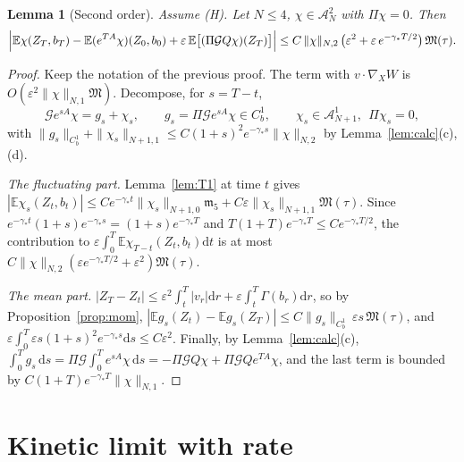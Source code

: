 \documentclass[11pt]{article}
\newcommand{\dd}{\mathrm{d}}
\newcommand{\E}{\mathbb{E}}
\newcommand{\eps}{\varepsilon}
\newcommand{\cG}{\mathcal{G}}
\newcommand{\cA}{\mathcal{A}}
\newcommand{\fm}{\mathfrak{m}}
\newcommand{\fM}{\mathfrak{M}}
\newcommand{\nrm}[2]{\|#1\|_{#2}}
\newtheorem{lemma}[theorem]{Lemma}
\theoremstyle{remark}
\begin{document}
\begin{lemma}[Second order]\label{lem:T2}
Assume (H). Let $N\le4$, $\chi\in\cA_N^2$ with $\Pi\chi=0$. Then
\[
  \Bigl|\E\chi(Z_T,b_T)-\E(e^{TA}\chi)(Z_0,b_0)
     +\eps\,\E\bigl[(\Pi\cG Q\chi)(Z_T)\bigr]\Bigr|
  \le C\,\nrm{\chi}{N,2}\,\bigl(\eps^2+\eps\,e^{-\gamma_*T/2}\bigr)\,\fM(\tau).
\]
\end{lemma}

\begin{proof}
Keep the notation of the previous proof. The term with $v\cdot\nabla_XW$
is $O(\eps^2\nrm{\chi}{N,1}\fM)$. Decompose, for $s=T-t$,
\[
  \cG e^{sA}\chi=g_s+\chi_s,\qquad g_s=\Pi\cG e^{sA}\chi\in C_b^1,\qquad
  \chi_s\in\cA_{N+1}^1,\ \ \Pi\chi_s=0,
\]
with $\nrm{g_s}{C_b^1}+\nrm{\chi_s}{N+1,1}\le
C(1+s)^2e^{-\gamma_*s}\nrm{\chi}{N,2}$ by Lemma~\ref{lem:calc}(c),(d).

\emph{The fluctuating part.} Lemma~\ref{lem:T1} at time $t$ gives
$|\E\chi_s(Z_t,b_t)|\le Ce^{-\gamma_*t}\nrm{\chi_s}{N+1,0}\fm_5
+C\eps\nrm{\chi_s}{N+1,1}\fM(\tau)$. Since
$e^{-\gamma_*t}(1+s)e^{-\gamma_*s}=(1+s)e^{-\gamma_*T}$ and
$T(1+T)e^{-\gamma_*T}\le Ce^{-\gamma_*T/2}$, the contribution to
$\eps\int_0^T\E\chi_{T-t}(Z_t,b_t)\dd t$ is at most
$C\nrm{\chi}{N,2}(\eps e^{-\gamma_*T/2}+\eps^2)\fM(\tau)$.

\emph{The mean part.} $|Z_T-Z_t|\le\eps^2\int_t^T|v_r|\dd r
+\eps\int_t^T\Gamma(b_r)\dd r$, so by Proposition~\ref{prop:mom},
$|\E g_s(Z_t)-\E g_s(Z_T)|\le C\nrm{g_s}{C_b^1}\,\eps s\,\fM(\tau)$, and
$\eps\int_0^T\eps s(1+s)^2e^{-\gamma_*s}\dd s\le C\eps^2$. Finally, by
Lemma~\ref{lem:calc}(c),
$\int_0^Tg_s\,\dd s=\Pi\cG\int_0^Te^{sA}\chi\,\dd s=-\Pi\cG Q\chi+\Pi\cG
Qe^{TA}\chi$, and the last term is bounded by
$C(1+T)e^{-\gamma_*T}\nrm{\chi}{N,1}$.
\end{proof}

\section{Kinetic limit with rate}
\end{document}
